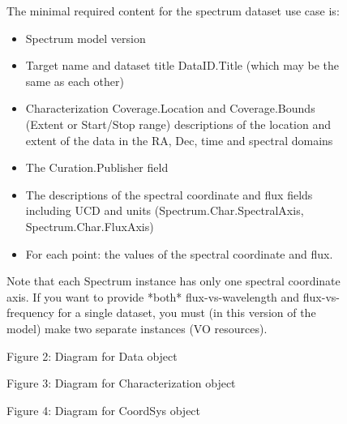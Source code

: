\documentclass[11pt]{article}
\begin{document}
\begin{figure}[h]
{{\begin{minipage}{6.0in}
The minimal required content for the spectrum dataset use case is:

\begin{itemize}
\item Spectrum model version
\item Target name and dataset title DataID.Title (which may be the same as each other)
\item  Characterization Coverage.Location and Coverage.Bounds (Extent or Start/Stop range) descriptions
       of the location and extent of the data in the RA, Dec, time and spectral domains
\item  The Curation.Publisher field
\item  The descriptions of the spectral coordinate and flux
fields including UCD and units  (Spectrum.Char.SpectralAxis, Spectrum.Char.FluxAxis)
\item  For each point: the values of the spectral coordinate and flux.
\end{itemize}

Note that each Spectrum instance has only one spectral coordinate axis.
If you want to provide *both* flux-vs-wavelength and flux-vs-frequency
for a single dataset, you must (in this version of the model)
make two separate instances (VO resources).

\end{minipage}
}
}
\end{figure}

\begin{figure}[h]

\colorbox{iblue}{
}
{
\colorbox{iblue}{
\begin{minipage}{6.0in}
Figure 2: Diagram for Data object

\end{minipage}
}
}

\colorbox{iblue}{
}
{
\colorbox{iblue}{
\begin{minipage}{6.0in}
Figure 3: Diagram for Characterization object
\end{minipage}
}
}

\end{figure}


\begin{figure}[h]


\colorbox{iblue}{
}
{
\colorbox{iblue}{
\begin{minipage}{6.0in}
Figure 4: Diagram for CoordSys object

\end{minipage}
}
}
\end{figure}
\end{document}
